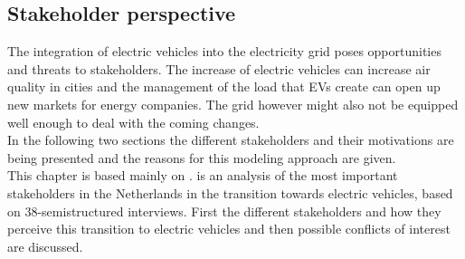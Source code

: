 \documentclass[a4paper]{article}
\begin{document}
\subsection{Stakeholder perspective}
The integration of electric vehicles into the electricity grid poses opportunities and threats to stakeholders. 
The increase of electric vehicles can increase air quality in cities and the management of the load that 
EVs create can open up new markets for energy companies. The grid however might also not be equipped well enough to 
deal with the coming changes.\\
In the following two sections the different stakeholders and their motivations are being presented and the reasons for 
this modeling approach are given.\\
This chapter is based mainly on \cite{ev_stakeholder}. \cite{ev_stakeholder} is an analysis of the most important stakeholders in 
the  Netherlands in the transition towards electric vehicles, based on 38-semistructured interviews.
First the different stakeholders and how they perceive this 
transition to electric vehicles and then possible conflicts of interest are discussed.
\end{document}
